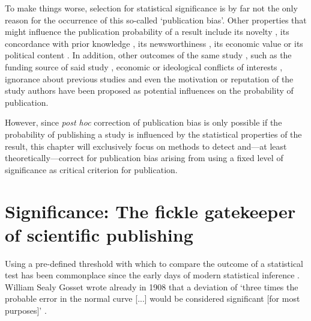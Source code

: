 To make things worse, selection for statistical significance is by far not the only reason for the occurrence of this so-called `publication bias'. Other properties that might influence the publication probability of a result include its novelty \citep{auspurg_what_2011}, its concordance with prior knowledge \citep{cooper_finding_1997}, its newsworthiness \citep{auspurg_what_2011}, its economic value \citep{chalmers_minimizing_1990} or its political content \citep{eitan_research_2018}. In addition, other outcomes of the same study \citep{dickersin_existence_1990}, such as the funding source of said study \citep{dickersin_existence_1990}, economic or ideological conflicts of interests \citep{chalmers_minimizing_1990, eitan_research_2018}, ignorance about previous studies \citep{chalmers_minimizing_1990} and even the motivation \citep{chalmers_minimizing_1990, cooper_finding_1997,auspurg_what_2011, franco_publication_2014} or reputation \citep{dickersin_existence_1990} of the study authors have been proposed as potential influences on the probability of publication.\par

However, since \textit{post hoc} correction of publication bias is only possible if the probability of publishing a study is influenced by the statistical properties of the result, this chapter will exclusively focus on methods to detect and---at least theoretically---correct for publication bias arising from using a fixed level of significance as critical criterion for publication.

\section{Significance: The fickle gatekeeper of scientific publishing}
\label{sec:significance_fickle}
Using a pre-defined threshold with which to compare the outcome of a statistical test has been commonplace since the early days of modern statistical inference \citep{cowles_origins_1982}. William Sealy Gosset wrote already in 1908 that a deviation of `three times the probable error in the normal curve [...] would be considered significant [for most purposes]' \citep[p.~13]{student_probable_1908}.\par

